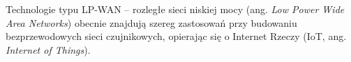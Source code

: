 Technologie typu LP-WAN -- rozległe sieci niskiej mocy (ang. \textsl{Low Power Wide Area Networks}) obecnie znajdują
szereg zastosowań przy budowaniu bezprzewodowych sieci czujnikowych, opierając się o Internet Rzeczy (IoT, ang.
\textsl{Internet of Things}).
